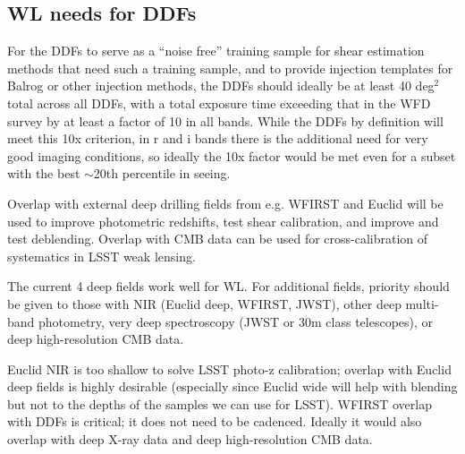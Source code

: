 \subsection{WL needs for DDFs}

For the DDFs to serve as a ``noise free'' training sample for shear estimation methods that need
such a training sample, and to provide injection templates for Balrog or other injection methods,
the DDFs should ideally be at least 40 deg$^2$ total across all DDFs, with a total exposure time
exceeding that in the WFD survey by at least a factor of 10 in all bands.  While the DDFs by
definition will meet this 10x criterion, in r and i bands there is the additional need for very good
imaging conditions, so ideally the 10x factor would be met even for a subset with the best
$\sim$20th percentile in seeing.

Overlap with external deep drilling fields from e.g. WFIRST and Euclid will be used to improve
photometric redshifts, test shear calibration, and improve and test deblending. Overlap with CMB
data can be used for cross-calibration of systematics in LSST weak lensing. 

The current 4 deep fields work well for WL.  For additional fields, priority should be given to
those with NIR (Euclid deep, WFIRST, JWST), other deep multi-band photometry, very deep
spectroscopy (JWST or 30m class telescopes), or deep high-resolution CMB data.

Euclid NIR is too shallow to solve LSST photo-z calibration; overlap with Euclid deep fields is
highly desirable (especially since Euclid wide will help with blending but not to the depths of the
samples we can use for LSST). WFIRST overlap with DDFs is critical; it does not need to be cadenced.  Ideally it would also overlap with
deep X-ray data and deep high-resolution CMB data.

